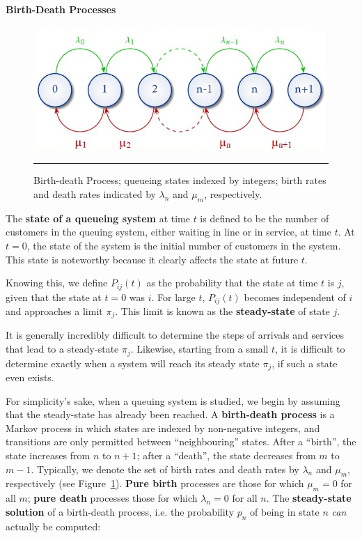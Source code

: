 \paragraph{Birth-Death Processes}
\begin{figure}[!t]
	\centering
		\includegraphics[width=0.99\textwidth]{images/QSD/fig2Queue.jpg}
	\caption[\small Birth-death process]{\small Birth-death Process; queueing states indexed by integers; birth rates and death rates indicated by $\lambda_n$ and $\mu_m$, respectively.}
	\label{fig:2}\hrule
\end{figure}
\afterpage{\FloatBarrier}
\noindent The \textbf{state of a queueing system} at time $t$ is defined to be the number of customers in the queuing system, either waiting in line or in service, at time $t$. At $t = 0$, the state of the system is  the initial number of customers in the system. This state is noteworthy because it clearly affects the state at future $t$. \par Knowing this, we define $P_{ij} (t)$ as the probability that the state at time $t$ is $j$, given that the state at $t = 0$ was $i$. For large $t$, $P_{ij} (t)$ becomes independent of $i$ and approaches a limit $\pi_{j}$. This limit is known as the \textbf{steady-state} of state $j$.\par It is generally incredibly difficult to determine the steps of arrivals and services that lead to a steady-state $\pi_j$. Likewise, starting from a small $t$, it is difficult to determine exactly when a system will reach
its steady state $\pi_j$, if such a state even exists. \par For simplicity's sake, when a queuing system is studied, we begin by assuming that the steady-state has already been reached.\newl  
A \textbf{birth-death process} is a Markov process in which states are indexed by non-negative integers, and transitions are only permitted between ``neighbouring'' states. After a ``birth'', the state increases from $n$ to $n+1$; after a ``death'', the state decreases from $m$ to $m-1$. Typically, we denote the set of birth rates and death rates by $\lambda_n$ and $\mu_m$, respectively (see Figure~\ref{fig:2}). \textbf{Pure birth} processes are those for which $\mu_m=0$ for all $m$; \textbf{pure death} processes those for which $\lambda_n=0$ for all $n$. The  \textbf{steady-state solution} of a birth-death process, i.e. the probability $p_n$ of being in state $n$ \textit{can} actually be computed: 
